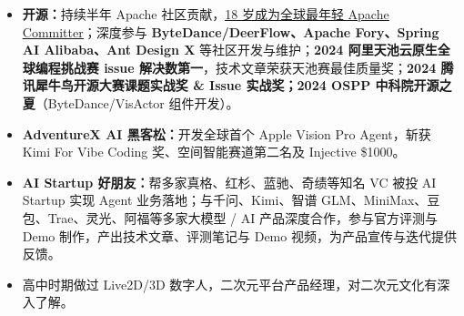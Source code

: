 \documentclass[12pt,a3paper,fontset=none]{ctexart}
\newcommand{\tighturl}[2]{\href{#1}{\uline{#2}}}
\begin{document}
\vspace{1mm}
\begin{itemize}
  \item \textbf{开源：}持续半年 Apache 社区贡献，\tighturl{https://github.com/LofiSu}{18 岁成为全球最年轻 Apache Committer}；深度参与 \textbf{ByteDance/DeerFlow、Apache Fory、Spring AI Alibaba、Ant Design X} 等社区开发与维护；\textbf{2024 阿里天池云原生全球编程挑战赛 issue 解决数第一}，技术文章荣获天池赛最佳质量奖；\textbf{2024 腾讯犀牛鸟开源大赛课题实战奖 \& Issue 实战奖；2024 OSPP 中科院开源之夏}（ByteDance/VisActor 组件开发）。
  \item \textbf{AdventureX AI 黑客松：}开发全球首个 Apple Vision Pro Agent，斩获 Kimi For Vibe Coding 奖、空间智能赛道第二名及 Injective \$1000。
  \item \textbf{AI Startup 好朋友：}帮多家真格、红杉、蓝驰、奇绩等知名 VC 被投 AI Startup 实现 Agent 业务落地；与千问、Kimi、智谱 GLM、MiniMax、豆包、Trae、灵光、阿福等多家大模型 / AI 产品深度合作，参与官方评测与 Demo 制作，产出技术文章、评测笔记与 Demo 视频，为产品宣传与迭代提供反馈。
  \item 高中时期做过 Live2D/3D 数字人，二次元平台产品经理，对二次元文化有深入了解。
\end{itemize}
\end{document}
